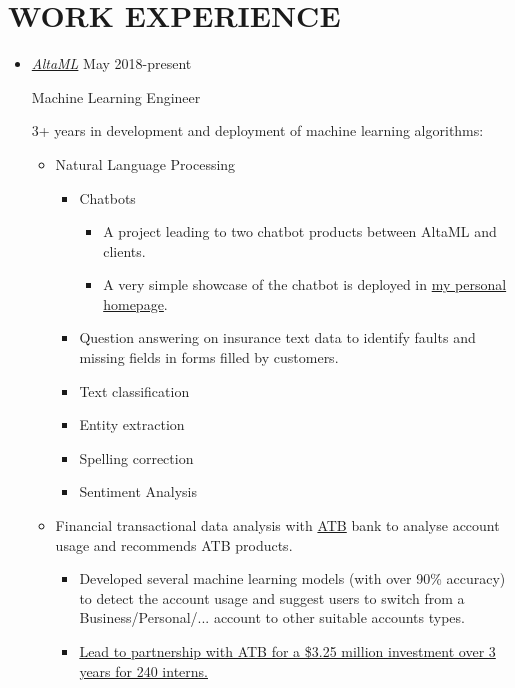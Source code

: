 \documentclass[11pt,a4paper,sans]{moderncv} %
\begin{document}
	\section{WORK EXPERIENCE}
	\begin{itemize}
		\item \href{http://altaml.com/}{ \emph{AltaML}} \hfill May 2018-present
		
		Machine Learning Engineer
		
		3+ years in development and deployment of machine learning algorithms: 
		\begin{itemize}
			\item Natural Language Processing
			\begin{itemize}
				\item Chatbots
				\begin{itemize}
				    \item A project leading to two chatbot products between AltaML and clients.
				    \item A very simple showcase of the chatbot is deployed in \href{http://hejazizo.com/}{my personal homepage}.
				\end{itemize}
				\item Question answering on insurance text data to identify faults and missing fields in forms filled by customers.
				\item Text classification
				\item Entity extraction
				\item Spelling correction
				\item Sentiment Analysis
			\end{itemize}
			\item Financial transactional data analysis with \href{https://www.atb.com/personal/}{ATB} bank to analyse account usage and recommends ATB products.
			
			\begin{itemize}
			    \item Developed several machine learning models (with over 90\% accuracy) to detect the account usage and suggest users to switch from a Business/Personal/... account to other suitable accounts types.
			    \item \href{https://www.altaml.com/news/opportunity-calgary-investment-fund-supports-altaml-initiative-to-create-ai-ml-talent-pipeline/}{Lead to partnership with ATB for a \$3.25 million investment over 3 years for 240 interns.}
			\end{itemize}
			

\end{itemize}
\end{itemize}
\end{document}
